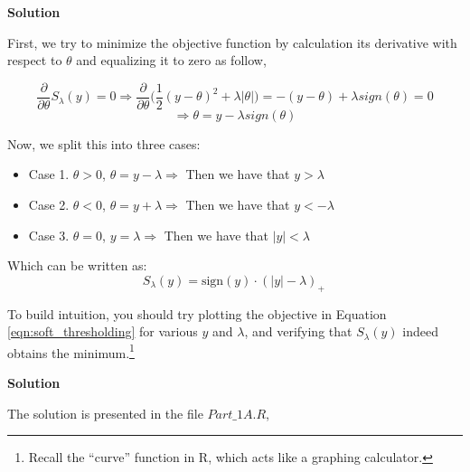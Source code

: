 \documentclass[11 pt]{article}
\begin{document}
\begin{enumerate}[label=(\Alph*)]
\vspace{2mm}
\textbf{Solution}

First, we try to minimize the objective function by calculation its derivative with respect to $\theta$ and equalizing it to zero as follow,

$$ \frac{\partial}{\partial \theta}S_\lambda(y) = 0 \Rightarrow  \frac{\partial }{\partial \theta} \bigg(\frac{1}{2}(y - \theta)^2 + \lambda | \theta |\bigg) =-(y - \theta) + \lambda sign (\theta) = 0 $$
$$ \Rightarrow  \theta = y - \lambda sign (\theta) $$

Now, we split this into three cases:

\begin{itemize}
	\item Case 1. $\theta>0$, $\theta = y - \lambda \Rightarrow$ 
	Then we have that $y > \lambda$
	\item Case 2. $\theta<0$, $\theta = y + \lambda \Rightarrow$ 
	Then we have that $y < - \lambda$
	\item Case 3. $\theta=0$, $ y = \lambda \Rightarrow$ 
	Then we have that $|y| < \lambda$
\end{itemize}

Which can be written as:
$$ S_\lambda(y) = \mbox{sign}(y) \cdot (|y| - \lambda)_+ \, $$

\newpage

To build intuition, you should try plotting the objective in Equation \ref{eqn:soft_thresholding} for various $y$ and $\lambda$, and verifying that $S_\lambda(y)$ indeed obtains the minimum.\footnote{Recall the ``curve'' function in R, which acts like a graphing calculator.}

\vspace{2mm}
\textbf{Solution}

The solution is presented in the file $Part\_1A.R$,




\end{enumerate}
\end{document}
